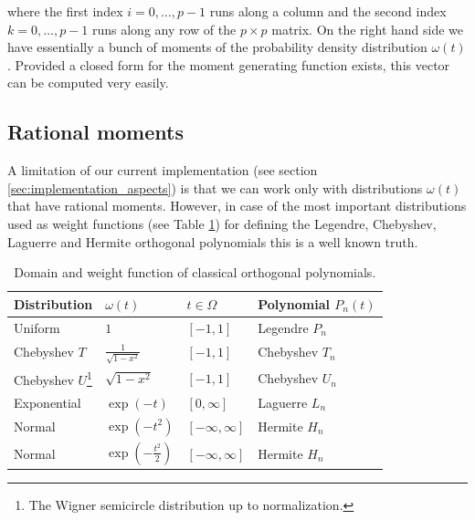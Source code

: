 \documentclass[a4paper,10pt]{article}
\begin{document}
where the first index $i = 0, \ldots, p-1$ runs along a column
and the second index $k = 0, \ldots, p-1$ runs along any row
of the $p \times p$ matrix. On the right hand side we have essentially
a bunch of moments of the probability density distribution $\omega(t)$.
Provided a closed form for the moment generating function exists,
this vector can be computed very easily.


\subsection{Rational moments}

A limitation of our current implementation (see section \ref{sec:implementation_aspects})
is that we can work only with distributions $\omega(t)$ that have rational moments.
However, in case of the most important distributions used as weight functions
(see Table \ref{eq:orthogonal_polynomials}) for defining the Legendre, Chebyshev, Laguerre
and Hermite orthogonal polynomials this is a well known truth.

\begin{savenotes}
\begin{table}[h!]
  \centering
  \begin{tabular}{|l|l|l|l|}
    \hline
    Distribution  & $\omega(t)$    & $t \in \Omega$      & Polynomial $P_n(t)$ \\
    \hline
    Uniform       & $1$            & $[-1, 1]$           & Legendre $P_n$ \\
    Chebyshev $T$ & $\frac{1}{\sqrt{1-x^2}}$ & $[-1, 1]$ & Chebyshev $T_n$ \\
    Chebyshev $U$\footnote{The Wigner semicircle distribution up to normalization.}
                  & $\sqrt{1-x^2}$ & $[-1, 1]$           & Chebyshev $U_n$ \\
    Exponential   & $\exp(-t)$     & $[0, \infty]$       & Laguerre $L_n$ \\
    Normal        & $\exp(-t^2)$   & $[-\infty, \infty]$ & Hermite $H_n$ \\
    Normal        & $\exp\!\left(-\frac{t^2}{2}\right)$
                  & $[-\infty, \infty]$                  & Hermite $H_n$ \\
    \hline
  \end{tabular}
  \caption{\label{eq:orthogonal_polynomials}
  Domain and weight function of classical orthogonal polynomials.}
\end{table}
\end{savenotes}
\end{document}
